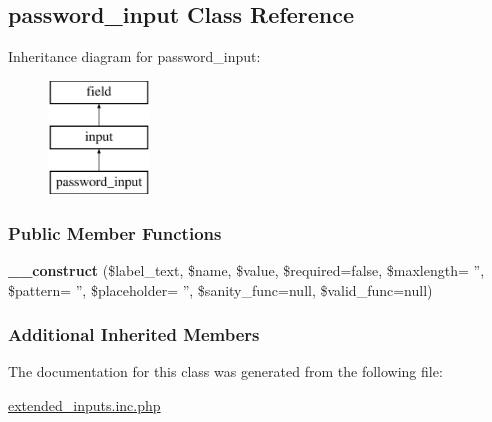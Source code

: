 \hypertarget{classpassword__input}{\subsection{password\-\_\-input Class Reference}
\label{classpassword__input}
}
Inheritance diagram for password\-\_\-input\-:\begin{figure}[H]
\begin{center}
\leavevmode
\includegraphics[height=3.000000cm]{classpassword__input}
\end{center}
\end{figure}
\subsubsection*{Public Member Functions}
\begin{DoxyCompactItemize}
\item 
\hypertarget{classpassword__input_a21c928f466357624ad5650055745328b}{{\bfseries \-\_\-\-\_\-construct} (\$label\-\_\-text, \$name, \$value, \$required=false, \$maxlength= '', \$pattern= '', \$placeholder= '', \$sanity\-\_\-func=null, \$valid\-\_\-func=null)}\label{classpassword__input_a21c928f466357624ad5650055745328b}

\end{DoxyCompactItemize}
\subsubsection*{Additional Inherited Members}


The documentation for this class was generated from the following file\-:\begin{DoxyCompactItemize}
\item 
\hyperlink{extended__inputs_8inc_8php}{extended\-\_\-inputs.\-inc.\-php}\end{DoxyCompactItemize}

